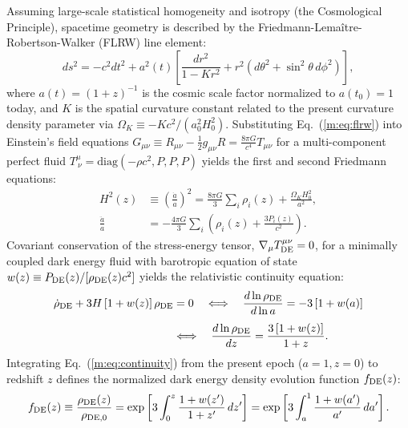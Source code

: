 \documentclass[aps,prd,preprint,superscriptaddress,nofootinbib]{revtex4-2}
\begin{document}
Assuming large-scale statistical homogeneity and isotropy (the Cosmological Principle), spacetime geometry is described by the Friedmann-Lema\^{i}tre-Robertson-Walker (FLRW) line element:
\begin{equation}
    ds^2 = -c^2 dt^2 + a^2(t) \left[ \frac{dr^2}{1 - K r^2} + r^2 \left( d\theta^2 + \sin^2\theta\, d\phi^2 \right) \right],
    \label{m:eq:flrw}
\end{equation}
where $a(t) = (1+z)^{-1}$ is the cosmic scale factor normalized to $a(t_0) = 1$ today, and $K$ is the spatial curvature constant related to the present curvature density parameter via $\Omega_K \equiv -K c^2 / (a_0^2 H_0^2)$. Substituting Eq.~(\ref{m:eq:flrw}) into Einstein's field equations $G_{\mu\nu} \equiv R_{\mu\nu} - \frac{1}{2}g_{\mu\nu}R = \frac{8\pi G}{c^4} T_{\mu\nu}$ for a multi-component perfect fluid $T^\mu_{\ \nu} = \text{diag}(-\rho c^2, P, P, P)$ yields the first and second Friedmann equations:
\begin{align}
    H^2(z) &\equiv \left(\frac{\dot{a}}{a}\right)^2 = \frac{8\pi G}{3} \sum_i \rho_i(z) + \frac{\Omega_K H_0^2}{a^2}, \label{m:eq:friedmann1} \\
    \frac{\ddot{a}}{a} &= -\frac{4\pi G}{3} \sum_i \left( \rho_i(z) + \frac{3 P_i(z)}{c^2} \right). \label{m:eq:friedmann2}
\end{align}
Covariant conservation of the stress-energy tensor, $\nabla_\mu T^{\mu\nu}_{\rm DE} = 0$, for a minimally coupled dark energy fluid with barotropic equation of state $w(z) \equiv P_{\rm DE}(z) / [\rho_{\rm DE}(z) c^2]$ yields the relativistic continuity equation:
\begin{equation}
\begin{aligned}
    \dot{\rho}_{\rm DE} + 3H \left[ 1 + w(z) \right] \rho_{\rm DE} &= 0 \quad \Longleftrightarrow \quad \frac{d \ln \rho_{\rm DE}}{d \ln a} = -3 \left[ 1 + w(a) \right] \\[4pt]
    &\Longleftrightarrow \quad \frac{d \ln \rho_{\rm DE}}{dz} = \frac{3\left[1 + w(z)\right]}{1 + z}.
\end{aligned}
    \label{m:eq:continuity}
\end{equation}
Integrating Eq.~(\ref{m:eq:continuity}) from the present epoch ($a=1, z=0$) to redshift $z$ defines the normalized dark energy density evolution function $f_{\rm DE}(z)$:
\begin{equation}
    f_{\rm DE}(z) \equiv \frac{\rho_{\rm DE}(z)}{\rho_{\rm DE,0}} = \exp \left[ 3 \int_0^z \frac{1 + w(z')}{1 + z'}\, dz' \right] = \exp \left[ 3 \int_a^1 \frac{1 + w(a')}{a'}\, da' \right].
    \label{m:eq:fde_general}
\end{equation}
\end{document}
